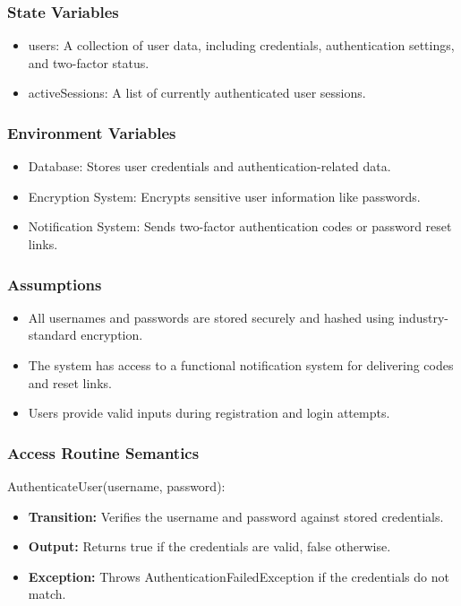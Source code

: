 \documentclass[12pt, titlepage]{article}
\begin{document}
\subsubsection{State Variables}

\begin{itemize}
    \item users: A collection of user data, including credentials, authentication settings, and two-factor status.
    \item activeSessions: A list of currently authenticated user sessions.
\end{itemize}

\subsubsection{Environment Variables}

\begin{itemize}
    \item Database: Stores user credentials and authentication-related data.
    \item Encryption System: Encrypts sensitive user information like passwords.
    \item Notification System: Sends two-factor authentication codes or password reset links.
\end{itemize}

\subsubsection{Assumptions}

\begin{itemize}
    \item All usernames and passwords are stored securely and hashed using industry-standard encryption.
    \item The system has access to a functional notification system for delivering codes and reset links.
    \item Users provide valid inputs during registration and login attempts.
\end{itemize}

\subsubsection{Access Routine Semantics}

\noindent AuthenticateUser(username, password):
\begin{itemize}
    \item \textbf{Transition:} Verifies the username and password against stored credentials.
    \item \textbf{Output:} Returns true if the credentials are valid, false otherwise.
    \item \textbf{Exception:} Throws AuthenticationFailedException if the credentials do not match.
\end{itemize}
\end{document}
